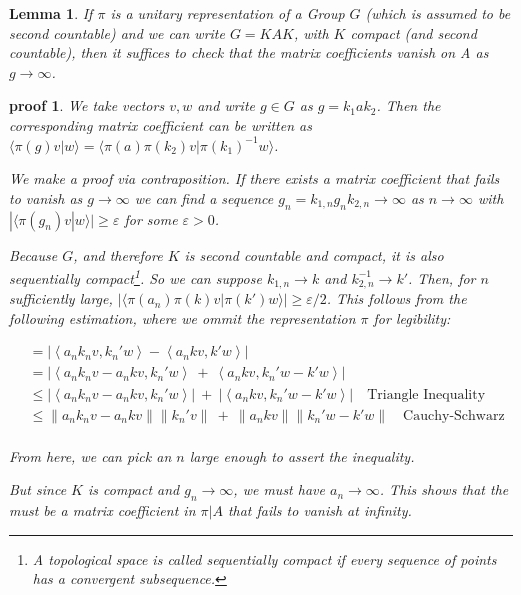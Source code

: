 \documentclass[
  12pt
]{article}
\theoremstyle{plain}
\newtheorem{lem}[thm]{Lemma}
\newtheorem*{pf}{proof}
\newcommand{\abs}[1]{| #1 |}
\newcommand{\inn}[1]{\left\langle #1 \right\rangle}
\newcommand{\norm}[1]{\lVert #1 \rVert}
\begin{document}
  \begin{lem}
    \label{lemma}
    If $\pi$ is a unitary representation of a Group $G$ (which is assumed to be second countable) and we can write $G =
    KAK$, with $K$ compact (and second countable), then it suffices to check that the matrix
    coefficients vanish on A as $g \rightarrow \infty$.
  \end{lem}

  \begin{pf}
    \label{pf:lemma}
    We take vectors $v, w$ and write $g \in G$ as $g = k_1 a k_2$.
    Then the corresponding matrix
    coefficient can be written as $\langle \pi(g)v|w \rangle = \langle \pi(a) \pi(k_2) v | \pi(k_1)^{-1} w \rangle$.

    We make a proof via contraposition.
    If there exists a matrix coefficient that fails to vanish as $g \rightarrow \infty$
    we can find a sequence $g_n = k_{1,n} g_{n} k_{2,n} \rightarrow \infty$ as
    $n \rightarrow \infty$ with
    $|\langle \pi(g_n) v | w \rangle | \geq \varepsilon$ for some $\varepsilon > 0$.

    Because $G$, and therefore $K$ is second countable and compact, it is also sequentially compact\footnote{A topological space is called \emph{sequentially compact} if every sequence of points has a convergent subsequence.}.
    So we can suppose $k_{1,n} \rightarrow k$ and $k_{2,n}^{-1} \rightarrow k'$.
    Then, for $n$ sufficiently large, $|\langle \pi(a_n)\pi(k)v | \pi(k') w \rangle | \geq \varepsilon/2$.
    This follows from the following estimation, where we ommit the representation $\pi$ for legibility:

    \begin{align*}
        &=\abs{\inn{a_n k_n v, k_n' w} - \inn{a_n k v, k' w}} \\
        &= \abs{\inn{a_nk_nv - a_nkv, k_n'w} \ + \ \inn{a_nkv, k_n'w - k'w}}  \\
        &\leq \abs{\inn{a_nk_nv - a_nkv, k_n'w}} \ + \ \abs{\inn{a_nkv, k_n'w - k'w}} \quad \text{Triangle Inequality} \\
        &\leq \norm{a_nk_nv - a_nkv}\norm{k_n'v} \ + \ \norm{a_nkv}\norm{k_n'w - k'w} \quad \text{Cauchy-Schwarz} \\
     \end{align*}

    From here, we can pick an $n$ large enough to assert the inequality.

    But since $K$ is compact and $g_n \rightarrow \infty$, we must have
    $a_n \rightarrow \infty$. This shows that the must be a matrix
    coefficient in $\pi | A$ that fails to vanish at infinity.
  \end{pf}
\end{document}
